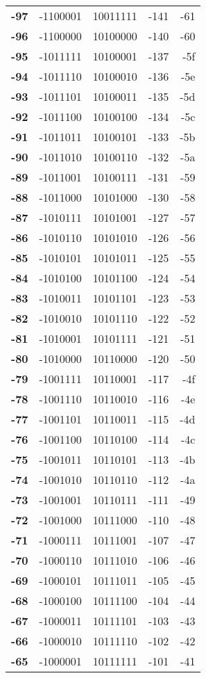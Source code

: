 \documentclass[a4paper]{article}
\begin{document}
\begin{tabular}{|>{\bfseries}r | r | r | r | r |}
-97&-1100001&10011111&-141&-61\\
-96&-1100000&10100000&-140&-60\\
-95&-1011111&10100001&-137&-5f\\
-94&-1011110&10100010&-136&-5e\\
-93&-1011101&10100011&-135&-5d\\
-92&-1011100&10100100&-134&-5c\\
-91&-1011011&10100101&-133&-5b\\
-90&-1011010&10100110&-132&-5a\\
-89&-1011001&10100111&-131&-59\\
-88&-1011000&10101000&-130&-58\\
-87&-1010111&10101001&-127&-57\\
-86&-1010110&10101010&-126&-56\\
-85&-1010101&10101011&-125&-55\\
-84&-1010100&10101100&-124&-54\\
-83&-1010011&10101101&-123&-53\\
-82&-1010010&10101110&-122&-52\\
-81&-1010001&10101111&-121&-51\\
-80&-1010000&10110000&-120&-50\\
-79&-1001111&10110001&-117&-4f\\
-78&-1001110&10110010&-116&-4e\\
-77&-1001101&10110011&-115&-4d\\
-76&-1001100&10110100&-114&-4c\\
-75&-1001011&10110101&-113&-4b\\
-74&-1001010&10110110&-112&-4a\\
-73&-1001001&10110111&-111&-49\\
-72&-1001000&10111000&-110&-48\\
-71&-1000111&10111001&-107&-47\\
-70&-1000110&10111010&-106&-46\\
-69&-1000101&10111011&-105&-45\\
-68&-1000100&10111100&-104&-44\\
-67&-1000011&10111101&-103&-43\\
-66&-1000010&10111110&-102&-42\\
-65&-1000001&10111111&-101&-41\\
\end{tabular}
\hspace*{3.0cm}
\end{document}
